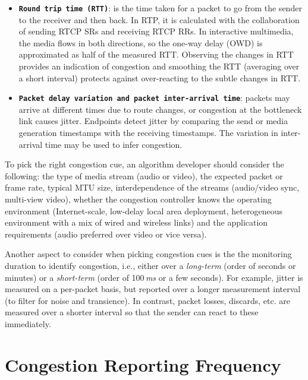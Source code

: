 \begin{itemize}

\item \textbf{\texttt{Round trip time (RTT)}}: is the time taken for a packet
to go from the sender to the receiver and then back. In RTP, it is calculated
with the collaboration of sending RTCP SRs and receiving RTCP RRs. In
interactive multimedia, the media flows in both directions, so the one-way
delay (OWD) is approximated as half of the measured RTT. Observing the changes
in RTT provides an indication of congestion and smoothing the RTT
(averaging over a short interval) protects against over-reacting to the subtle
changes in RTT.

\item \textbf{\texttt{Packet delay variation and packet inter-arrival time}}:
packets may arrive at different times due to route changes, or congestion at
the bottleneck link causes jitter. Endpoints detect jitter by comparing the
send or media generation timestamps with the receiving timestamps. The
variation in inter-arrival time may be used to infer congestion.


\end{itemize}

To pick the right congestion cue, an algorithm developer should consider the
following: the type of media stream (audio or video), the expected packet or
frame rate, typical MTU size, interdependence of the streams (audio/video
sync, multi-view video), whether the congestion controller knows the operating environment (Internet-scale,
low-delay local area deployment, heterogeneous environment with a mix
of wired and wireless links) and the application requirements (audio preferred
over video or vice versa).

Another aspect to consider when picking congestion cues is the the monitoring
duration to identify congestion, i.e., either over a \emph{long-term} (order
of seconds or minutes) or a \emph{short-term} (order of 100\,\emph{ms} or a
few seconds). For example, jitter is measured on a per-packet basis, but
reported over a longer measurement interval (to filter for noise and
transience). In contrast, packet losses, discards, etc. are measured over a
shorter interval so that the sender can react to these immediately.

\section{Congestion Reporting Frequency}
\label{fw.freq}

